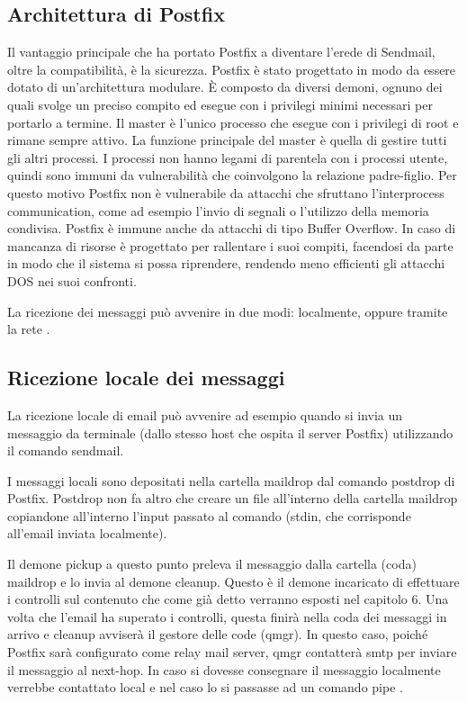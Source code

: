   \subsection{Architettura di Postfix}
  Il vantaggio principale che ha portato Postfix a diventare l’erede di Sendmail, oltre la compatibilità, è la sicurezza. Postfix è stato progettato in modo da essere dotato di un’architettura modulare. È composto da diversi demoni, ognuno dei quali svolge un preciso compito ed esegue con i privilegi minimi necessari per portarlo a termine. Il  master è l’unico processo che esegue con i privilegi di root e rimane sempre attivo. La funzione principale del master è quella di gestire tutti gli altri processi. I processi non hanno legami di parentela con i processi utente, quindi sono immuni da vulnerabilità che coinvolgono la relazione padre-figlio. Per questo motivo Postfix non è vulnerabile da attacchi che sfruttano l’interprocess communication, come ad esempio l’invio di segnali o l’utilizzo della memoria condivisa. Postfix è immune anche da attacchi di tipo Buffer Overflow. In caso di mancanza di risorse è progettato per rallentare i suoi compiti, facendosi da parte in modo che il sistema si possa riprendere, rendendo meno efficienti gli attacchi DOS nei suoi confronti.
  
  La ricezione dei messaggi può avvenire in due modi: localmente, oppure tramite la rete \cite{hildebrandt2005book}.
  
  \subsection{Ricezione locale dei messaggi}
  La ricezione locale di email può avvenire ad esempio quando si invia un messaggio da terminale (dallo stesso host che ospita il server Postfix) utilizzando il comando sendmail. 
  
  I messaggi locali sono depositati nella cartella maildrop dal comando postdrop di Postfix. Postdrop non fa altro che creare un file all’interno della cartella maildrop copiandone all’interno l’input passato al comando (stdin, che corrisponde all'email inviata localmente). 
  
  Il demone pickup a questo punto preleva il messaggio dalla cartella (coda) maildrop e lo invia al demone cleanup. Questo è il demone incaricato di effettuare i controlli sul contenuto che come già detto verranno esposti nel capitolo 6. Una volta che l’email ha superato i controlli, questa finirà nella coda dei messaggi in arrivo e cleanup avviserà il gestore delle code (qmgr). 
  In questo caso, poiché Postfix sarà configurato come relay mail server, qmgr contatterà smtp per inviare il messaggio al next-hop. In caso si dovesse consegnare il messaggio localmente verrebbe contattato local e nel caso lo si passasse ad un comando pipe \cite{Postfix2}.
  
